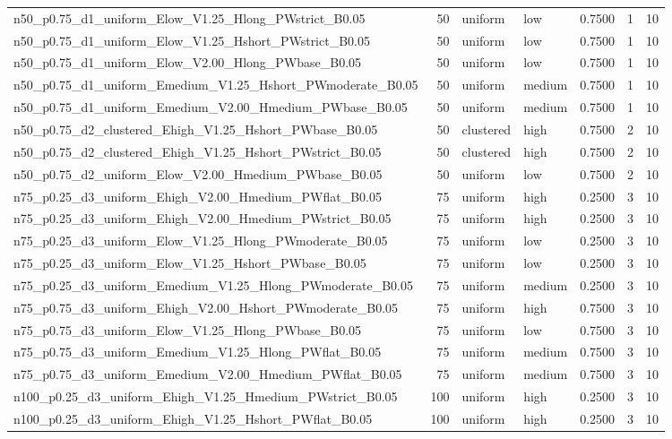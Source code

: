 \begin{tabular}{lrllrrr}
n50_p0.75_d1_uniform_Elow_V1.25_Hlong_PWstrict_B0.05 & 50 & uniform & low & 0.7500 & 1 & 10 \\
n50_p0.75_d1_uniform_Elow_V1.25_Hshort_PWstrict_B0.05 & 50 & uniform & low & 0.7500 & 1 & 10 \\
n50_p0.75_d1_uniform_Elow_V2.00_Hlong_PWbase_B0.05 & 50 & uniform & low & 0.7500 & 1 & 10 \\
n50_p0.75_d1_uniform_Emedium_V1.25_Hshort_PWmoderate_B0.05 & 50 & uniform & medium & 0.7500 & 1 & 10 \\
n50_p0.75_d1_uniform_Emedium_V2.00_Hmedium_PWbase_B0.05 & 50 & uniform & medium & 0.7500 & 1 & 10 \\
n50_p0.75_d2_clustered_Ehigh_V1.25_Hshort_PWbase_B0.05 & 50 & clustered & high & 0.7500 & 2 & 10 \\
n50_p0.75_d2_clustered_Ehigh_V1.25_Hshort_PWstrict_B0.05 & 50 & clustered & high & 0.7500 & 2 & 10 \\
n50_p0.75_d2_uniform_Elow_V2.00_Hmedium_PWbase_B0.05 & 50 & uniform & low & 0.7500 & 2 & 10 \\
n75_p0.25_d3_uniform_Ehigh_V2.00_Hmedium_PWflat_B0.05 & 75 & uniform & high & 0.2500 & 3 & 10 \\
n75_p0.25_d3_uniform_Ehigh_V2.00_Hmedium_PWstrict_B0.05 & 75 & uniform & high & 0.2500 & 3 & 10 \\
n75_p0.25_d3_uniform_Elow_V1.25_Hlong_PWmoderate_B0.05 & 75 & uniform & low & 0.2500 & 3 & 10 \\
n75_p0.25_d3_uniform_Elow_V1.25_Hshort_PWbase_B0.05 & 75 & uniform & low & 0.2500 & 3 & 10 \\
n75_p0.25_d3_uniform_Emedium_V1.25_Hlong_PWmoderate_B0.05 & 75 & uniform & medium & 0.2500 & 3 & 10 \\
n75_p0.75_d3_uniform_Ehigh_V2.00_Hshort_PWmoderate_B0.05 & 75 & uniform & high & 0.7500 & 3 & 10 \\
n75_p0.75_d3_uniform_Elow_V1.25_Hlong_PWbase_B0.05 & 75 & uniform & low & 0.7500 & 3 & 10 \\
n75_p0.75_d3_uniform_Emedium_V1.25_Hlong_PWflat_B0.05 & 75 & uniform & medium & 0.7500 & 3 & 10 \\
n75_p0.75_d3_uniform_Emedium_V2.00_Hmedium_PWflat_B0.05 & 75 & uniform & medium & 0.7500 & 3 & 10 \\
n100_p0.25_d3_uniform_Ehigh_V1.25_Hmedium_PWstrict_B0.05 & 100 & uniform & high & 0.2500 & 3 & 10 \\
n100_p0.25_d3_uniform_Ehigh_V1.25_Hshort_PWflat_B0.05 & 100 & uniform & high & 0.2500 & 3 & 10 \\

\end{tabular}
